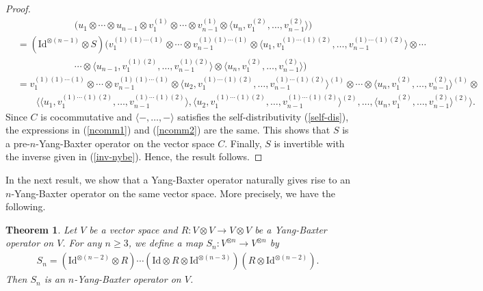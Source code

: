 \documentclass[a4paper,reqno,10pt]{amsart}
\theoremstyle{plain}
\newtheorem{thm}{Theorem}[section]
\theoremstyle{definition}
\theoremstyle{remark}
\begin{document}
\begin{proof}
\begin{align}
        & \qquad \qquad \qquad \big(    u_1 \otimes \cdots \otimes u_{n-1} \otimes v_1^{(1)} \otimes \cdots \otimes v_{n-1}^{(1)} \otimes \langle u_n, v_1^{(2)}, \ldots, v_{n-1}^{(2)} \rangle \big)  \nonumber  \\
        &= (\mathrm{Id}^{\otimes (n-1)} \otimes S) \big(   v_1^{(1) (1) \cdots (1)} \otimes \cdots \otimes v_{n-1}^{(1) (1) \cdots (1)} \otimes \langle u_1, v_1^{(1) \cdots (1) (2)}, \ldots, v_{n-1}^{(1) \cdots (1) (2)}   \rangle \otimes \cdots  \nonumber \\
        & \qquad \qquad \qquad  \cdots \otimes \langle u_{n-1}, v_1^{(1) (2)}, \ldots, v_{n-1}^{(1) (2)} \rangle \otimes \langle u_n , v_1^{(2)}, \ldots, v_{n-1}^{(2)} \rangle   \big)  \nonumber \\
        &= v_1^{(1) (1) \cdots (1)} \otimes \cdots \otimes v_{n-1}^{(1) (1) \cdots (1)} \otimes \langle u_2, v_1^{(1) \cdots (1) (2)} , \ldots, v_{n-1}^{(1) \cdots (1) (2)}   \rangle^{(1)} \otimes \cdots \otimes \langle  u_n , v_1^{(2)}, \ldots, v_{n-1}^{(2)} \rangle^{(1)} \otimes \nonumber \\
        & \qquad \big\langle  \langle u_1, v_1^{(1) \cdots (1) (2)}, \ldots , v_{n-1}^{(1) \cdots (1) (2)} \rangle, \langle u_2, v_1^{(1) \cdots (1) (2)}, \ldots , v_{n-1}^{(1) \cdots (1) (2)} \rangle^{(2)}, \ldots,  \langle u_n, v_1^{(2)}, \ldots, v_{n-1}^{(2)} \rangle^{(2)} \big\rangle.
    \end{align}
    Since $C$ is cocommutative and $\langle -, \ldots, - \rangle$ satisfies the self-distributivity (\ref{self-dis}), the expressions in (\ref{ncomm1}) and (\ref{ncomm2}) are the same. This shows that $S$ is a pre-$n$-Yang-Baxter operator on the vector space $C$. Finally, $S$ is invertible with the inverse given in (\ref{inv-nybe}). Hence, the result follows.  
\end{proof}

In the next result, we show that a Yang-Baxter operator naturally gives rise to an $n$-Yang-Baxter operator on the same vector space. More precisely, we have the following.


\begin{thm}\label{them-soln-nsoln}
     Let $V$ be a vector space and $R: V \otimes V \rightarrow V \otimes V$ be a Yang-Baxter operator on $V$. For any $n \geq 3$, we define a map $S_n : V^{\otimes n} \rightarrow V^{\otimes n}$ by
     \begin{align*}
         S_n = (\mathrm{Id}^{\otimes (n-2)} \otimes R) \cdots (\mathrm{Id} \otimes R \otimes \mathrm{Id}^{\otimes (n-3)}) (R \otimes \mathrm{Id}^{\otimes (n-2)}).
     \end{align*}
     Then $S_n$ is an $n$-Yang-Baxter operator on $V$.
\end{thm}
\end{document}
